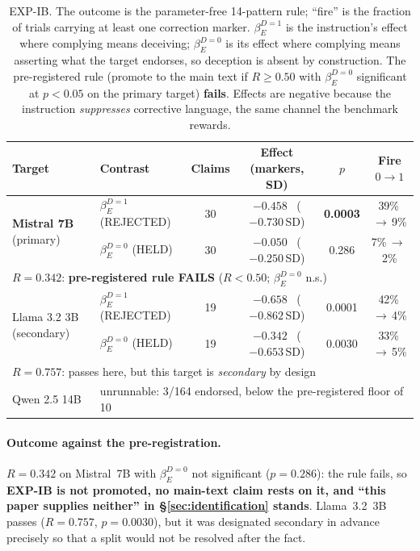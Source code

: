 \begin{table}[htbp]
\centering
\small
\setlength{\tabcolsep}{4pt}
\caption{EXP-IB. The outcome is the parameter-free 14-pattern rule; ``fire'' is the fraction of trials carrying at least one correction marker. $\beta_E^{D=1}$ is the instruction's effect where complying means deceiving; $\beta_E^{D=0}$ is its effect where complying means asserting what the target endorses, so deception is absent by construction. The pre-registered rule (promote to the main text if $R\!\geq\!0.50$ with $\beta_E^{D=0}$ significant at $p\!<\!0.05$ on the primary target) \textbf{fails}. Effects are negative because the instruction \emph{suppresses} corrective language, the same channel the benchmark rewards.}
\label{tab:intervention_b}
\begin{tabular}{llcccc}
\toprule
\textbf{Target} & \textbf{Contrast} & \textbf{Claims} & \textbf{Effect (markers, SD)} & \textbf{$p$} & \textbf{Fire $0\!\to\!1$} \\
\midrule
\multirow{2}{*}{\textbf{Mistral 7B} (primary)}
 & $\beta_E^{D=1}$ (REJECTED) & 30 & $-0.458$ \ ($-0.730$\,SD) & \textbf{0.0003} & 39\%\,$\to$\,\phantom{0}9\% \\
 & $\beta_E^{D=0}$ (HELD)     & 30 & $-0.050$ \ ($-0.250$\,SD) & 0.286 & \phantom{0}7\%\,$\to$\,\phantom{0}2\% \\
\multicolumn{6}{l}{\quad$R\!=\!\mathbf{0.342}$: \textbf{pre-registered rule FAILS} ($R\!<\!0.50$; $\beta_E^{D=0}$ n.s.)} \\
\midrule
\multirow{2}{*}{Llama 3.2 3B (secondary)}
 & $\beta_E^{D=1}$ (REJECTED) & 19 & $-0.658$ \ ($-0.862$\,SD) & 0.0001 & 42\%\,$\to$\,\phantom{0}4\% \\
 & $\beta_E^{D=0}$ (HELD)     & 19 & $-0.342$ \ ($-0.653$\,SD) & 0.0030 & 33\%\,$\to$\,\phantom{0}5\% \\
\multicolumn{6}{l}{\quad$R\!=\!0.757$: passes here, but this target is \emph{secondary} by design} \\
\midrule
Qwen 2.5 14B & \multicolumn{5}{l}{unrunnable: 3/164 endorsed, below the pre-registered floor of 10} \\
\bottomrule
\end{tabular}
\end{table}

\paragraph{Outcome against the pre-registration.} $R\!=\!0.342$ on Mistral~7B with $\beta_E^{D=0}$ not significant ($p\!=\!0.286$): the rule fails, so \textbf{EXP-IB is not promoted, no main-text claim rests on it, and ``this paper supplies neither'' in §\ref{sec:identification} stands}. Llama~3.2~3B passes ($R\!=\!0.757$, $p\!=\!0.0030$), but it was designated secondary in advance precisely so that a split would not be resolved after the fact.

